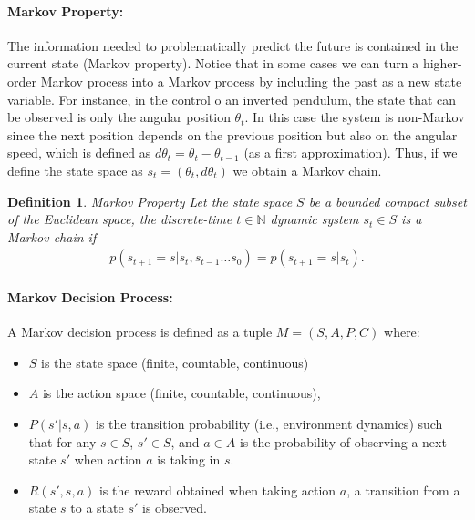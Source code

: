 \documentclass[]{usiinfdocprop}
\newtheorem{definition}[theorem]{Definition}
\begin{document}
\paragraph{Markov Property:} The information needed to problematically predict the future is contained in the current state (Markov property). Notice that in some cases we can turn a higher-order Markov process into a Markov process by including the past as a new state variable. For instance, in the control o an inverted pendulum, the state that can be observed is only the angular position $\theta_t$. In this case the system is non-Markov since the next position depends on the previous position but also on the angular speed, which is defined as $d\theta_t = \theta_t - \theta_{t−1}$ (as a first approximation). Thus, if we define the state space as $s_t = (\theta_t, d\theta_t)$ we obtain a Markov chain.

\begin{definition}{Markov Property}
Let the state space $S$ be a bounded compact subset of the Euclidean space, the discrete-time $t \in \mathbb{N}$ dynamic system $s_t \in S$ is a Markov chain if
\begin{align}
    p(s_{t+1}=s|s_t,s_{t-1} \ldots s_{0}) = p(s_{t+1}=s|s_t). 
\end{align}
\end{definition}


\paragraph{Markov Decision Process:} A Markov decision process is defined as a tuple $M = (S, A, P, C)$ where:
\begin{itemize}
    \item $S$ is the state space (finite, countable, continuous)
    \item $A$ is the action space (finite, countable, continuous),
    \item $P(s'|s, a)$ is the transition probability (i.e., environment dynamics) such that for any $s \in S$, $s' \in S$, and $a \in A$ is the probability of observing a next state $s'$ when action $a$ is taking in $s$.
\item $R(s',s,a)$ is the reward obtained when taking action $a$, a transition from a state $s$ to a state $s'$
is observed.
\end{itemize}








\backmatter


\end{document}
